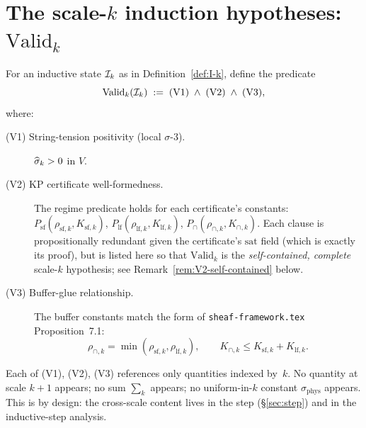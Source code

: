 \section{The scale-$k$ induction hypotheses: $\mathrm{Valid}_k$}
\label{sec:valid}

\begin{definition}
\label{def:valid-k}
For an inductive state $\mathcal{I}_k$ as in Definition~\ref{def:I-k}, define the predicate
\begin{equation}
  \mathrm{Valid}_k(\mathcal{I}_k) \;:=\; \mathrm{(V1)} \;\wedge\; \mathrm{(V2)} \;\wedge\; \mathrm{(V3)},
\end{equation}
where:
\begin{description}
  \item[\textnormal{(V1) String-tension positivity (local $\sigma$-$3$).}] $\widehat{\sigma}_k > 0$ in $V$.
  \item[\textnormal{(V2) KP certificate well-formedness.}] The regime predicate holds for each certificate's constants: $P_{\mathrm{sf}}(\rho_{\mathrm{sf}, k}, K_{\mathrm{sf}, k})$, $P_{\mathrm{lf}}(\rho_{\mathrm{lf}, k}, K_{\mathrm{lf}, k})$, $P_{\cap}(\rho_{\cap, k}, K_{\cap, k})$.  Each clause is propositionally redundant given the certificate's $\mathrm{sat}$ field (which is exactly its proof), but is listed here so that $\mathrm{Valid}_k$ is the \emph{self-contained, complete} scale-$k$ hypothesis; see Remark~\ref{rem:V2-self-contained} below.
  \item[\textnormal{(V3) Buffer-glue relationship.}] The buffer constants match the form of \texttt{sheaf-framework.tex} Proposition~7.1:
  \begin{equation}
    \label{eq:buffer-glue}
    \rho_{\cap, k} = \min(\rho_{\mathrm{sf}, k}, \rho_{\mathrm{lf}, k}),
    \qquad
    K_{\cap, k} \le K_{\mathrm{sf}, k} + K_{\mathrm{lf}, k}.
  \end{equation}
\end{description}
\end{definition}

\begin{remark}
\label{rem:scale-k-local}
Each of (V1), (V2), (V3) references only quantities indexed by~$k$.  No quantity at scale $k+1$ appears; no sum $\sum_k$ appears; no uniform-in-$k$ constant $\sigma_{\mathrm{phys}}$ appears.  This is by design: the cross-scale content lives in the step (\S\ref{sec:step}) and in the inductive-step analysis.
\end{remark}

